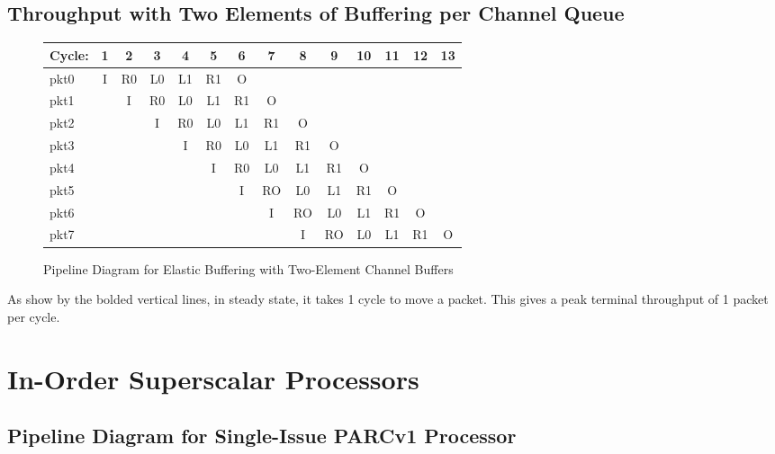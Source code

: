 \documentclass[10pt]{article}
\begin{document}
\subsection{Throughput with Two Elements of Buffering per Channel Queue}

\begin{figure}[H]
\centering
{\setlength{\tabcolsep}{2pt}
\begin{tabular}{|l|c|c|c|c|c|c|c|c|c!{\vrule width 1.5pt}c!{\vrule width 1.5pt}c!{\vrule width 1.5pt}c!{\vrule width 1.5pt}c|}
\hline
Cycle: & 1  & 2  & 3  & 4  & 5  & 6  & 7  & 8  & 9  & 10 & 11 & 12 & 13 \\ \hline
pkt0   & I  & R0 & L0 & L1 & R1 & O  &    &    &    &    &    &    &    \\ \hline
pkt1   &    & I  & R0 & L0 & L1 & R1 & O  &    &    &    &    &    &    \\ \hline
pkt2   &    &    & I  & R0 & L0 & L1 & R1 & O  &    &    &    &    &    \\ \hline
pkt3   &    &    &    & I  & R0 & L0 & L1 & R1 & O  &    &    &    &    \\ \hline
pkt4   &    &    &    &    & I  & R0 & L0 & L1 & R1 & O  &    &    &    \\ \hline
pkt5   &    &    &    &    &    & I  & RO & L0 & L1 & R1 & O  &    &    \\ \hline
pkt6   &    &    &    &    &    &    & I  & RO & L0 & L1 & R1 & O  &    \\ \hline
pkt7   &    &    &    &    &    &    &    & I  & RO & L0 & L1 & R1 & O  \\ \hline
\end{tabular}
}
\caption{Pipeline Diagram for Elastic Buffering with Two-Element Channel Buffers}
\end{figure}
As show by the bolded vertical lines, in steady state, it takes 1 cycle to move a packet. This gives a peak terminal throughput of 1 packet per cycle.

\cleardoublepage
\section{In-Order Superscalar Processors}

\subsection{Pipeline Diagram for Single-Issue PARCv1 Processor}
\end{document}

